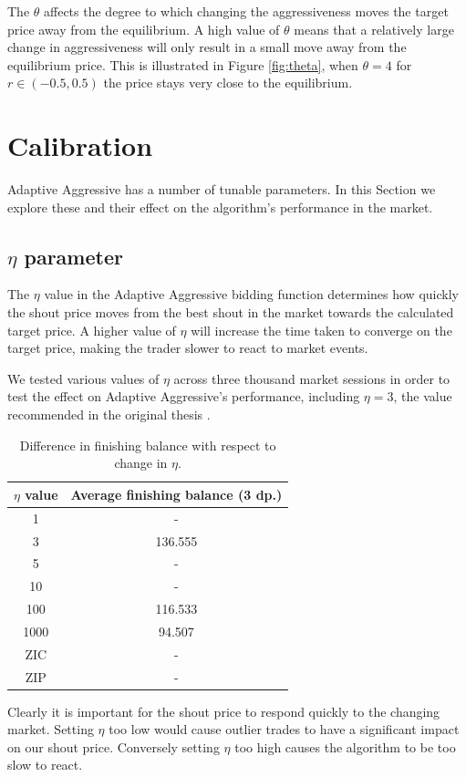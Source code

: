 \documentclass[preprint]{acm_proc_article-sp} %
\begin{document}
The $\theta$ affects the degree to which changing the aggressiveness moves the
target price away from the equilibrium. A high value of $\theta$ means that a
relatively large change in aggressiveness will only result in a small move away from
the equilibrium price. This is illustrated in Figure \ref{fig:theta}, when
$\theta=4$ for $r \in (-0.5, 0.5)$ the price stays very close
to the equilibrium.\\



\section{Calibration} \label{sec:calibration}
Adaptive Aggressive has a number of tunable parameters. In this Section we explore these and their 
effect on the algorithm's performance in the market.\\


\subsection{$\eta$ parameter} \label{sec:calibration_eta}
The $\eta$ value in the Adaptive Aggressive bidding function determines how quickly the shout price 
moves from the best shout in the market towards the calculated target price. A higher value of $\eta$ will increase 
the time taken to converge on the target price, making the trader slower to react to market events. 

We tested various values of $\eta$ across three thousand market sessions in order to test the effect on Adaptive Aggressive's 
performance, including $\eta = 3$, the value recommended in the original thesis \cite{AA_thesis}.
\begin{table}[H]
  \centering
  \begin{tabular}{ | c | c | }
    \hline
    \textbf{$\eta$ value} & \textbf{Average finishing balance (3 dp.)} \\
    \hline
        1 & - \\
        3 & 136.555 \\
        5 & - \\
        10 & - \\
        100 & 116.533 \\
        1000 & 94.507 \\
    \hline \hline
        ZIC & - \\
        ZIP & - \\
    \hline
  \end{tabular}
  \caption{Difference in finishing balance with respect to change in $\eta$.}
  \label{tbl:eta_results}
\end{table}
Clearly it is important for the shout price to respond quickly to the changing market. Setting $\eta$ 
too low would cause outlier trades to have a significant impact on our shout price. Conversely setting 
$\eta$ too high causes the algorithm to be too slow to react.\\
\end{document}
